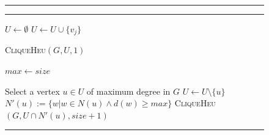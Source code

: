 \begin{figure}
\vspace{10pt}
\hrule
\vspace{6pt}
\begin{spacing}{\algospacing}
{
{\small
{}\label{alg:mClqHeu}
\vspace{-5pt}
\hrule
\vspace{6pt}

\noindent\begin{minipage}{.5\textwidth}
\vspace{12pt}
\begin{algorithmic}[1]
{}
\State $U \leftarrow \emptyset$
\State $U \leftarrow U \cup \{v_j\}$ 
\EndIf
\EndFor

\State \textsc{CliqueHeu}$(G, U, 1)$
\EndIf

\EndFor
\EndProcedure
\end{algorithmic}
\end{minipage}%
\begin{minipage}{.5\textwidth}
\vspace{-7pt}
\label{alg:clqHeu}
\begin{algorithmic}[1]

\State $max \leftarrow size$
\EndIf
{}
\EndIf


\State Select a vertex $u \in U$ of maximum degree in $G$ \label{maxDsel}
\State $U \leftarrow U \setminus \{u\} $
\State $N'(u):= \{w | w \in N(u) \wedge d(w) \ge max\}$  \label{pr4}
\State \textsc{CliqueHeu}$( G, U \cap N'(u), size + 1)$


\EndProcedure

\end{algorithmic}
\end{minipage}
}
}
\end{spacing}
\vspace{8pt}
\hrule
\end{figure}









